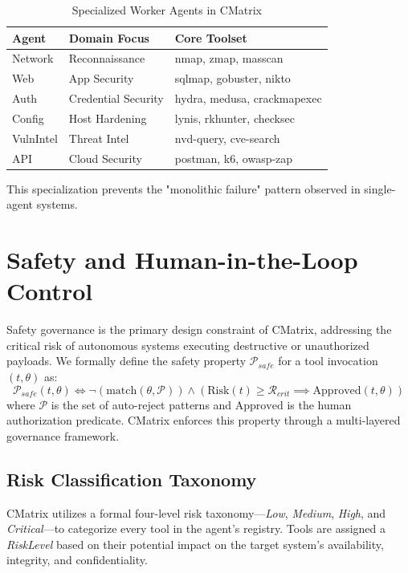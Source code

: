 \documentclass[conference,compsoc]{IEEEtran}
\begin{document}
\begin{table}[htbp]
\centering
\caption{Specialized Worker Agents in CMatrix}
\label{tab:agents}
\begin{tabular}{lll}
\toprule
\textbf{Agent} & \textbf{Domain Focus} & \textbf{Core Toolset} \\
\midrule
Network & Reconnaissance & nmap, zmap, masscan \\
Web & App Security & sqlmap, gobuster, nikto \\
Auth & Credential Security & hydra, medusa, crackmapexec \\
Config & Host Hardening & lynis, rkhunter, checksec \\
VulnIntel & Threat Intel & nvd-query, cve-search \\
API & Cloud Security & postman, k6, owasp-zap \\
\bottomrule
\end{tabular}
\end{table}

This specialization prevents the "monolithic failure" pattern observed in single-agent systems.

\section{Safety and Human-in-the-Loop Control} \label{sec:safety}
Safety governance is the primary design constraint of CMatrix, addressing the critical risk of autonomous systems executing destructive or unauthorized payloads. We formally define the safety property $\mathcal{P}_{safe}$ for a tool invocation $(t, \theta)$ as:
\begin{equation}
\mathcal{P}_{safe}(t, \theta) \iff \neg (\text{match}(\theta, \mathcal{P})) \wedge (\text{Risk}(t) \geq \mathcal{R}_{crit} \implies \text{Approved}(t, \theta))
\end{equation}
where $\mathcal{P}$ is the set of auto-reject patterns and $\text{Approved}$ is the human authorization predicate. CMatrix enforces this property through a multi-layered governance framework.

\subsection{Risk Classification Taxonomy}
CMatrix utilizes a formal four-level risk taxonomy---\textit{Low}, \textit{Medium}, \textit{High}, and \textit{Critical}---to categorize every tool in the agent's registry. Tools are assigned a \textit{RiskLevel} based on their potential impact on the target system's availability, integrity, and confidentiality.
\end{document}

